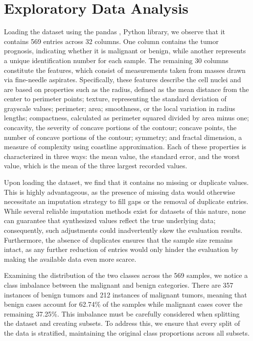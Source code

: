 \documentclass[en]{dimscthesis}
\begin{document}
\section{Exploratory Data Analysis} \label{eda}

Loading the dataset using the pandas \cite{bib:pandas}, \cite{bib:pandas_software} Python library, we observe that it contains 569 entries across 32 columns. One column contains the tumor prognosis, indicating whether it is malignant or benign, while another represents a unique identification number for each sample. The remaining 30 columns constitute the features, which consist of measurements taken from masses drawn via fine-needle aspirates. Specifically, these features describe the cell nuclei and are based on properties such as the radius, defined as the mean distance from the center to perimeter points; texture, representing the standard deviation of grayscale values; perimeter; area; smoothness, or the local variation in radius lengths; compactness, calculated as perimeter squared divided by area minus one; concavity, the severity of concave portions of the contour; concave points, the number of concave portions of the contour; symmetry; and fractal dimension, a measure of complexity using coastline approximation. Each of these properties is characterized in three ways: the mean value, the standard error, and the worst value, which is the mean of the three largest recorded values.

Upon loading the dataset, we find that it contains no missing or duplicate values. This is highly advantageous, as the presence of missing data would otherwise necessitate an imputation strategy to fill gaps or the removal of duplicate entries. While several reliable imputation methods exist for datasets of this nature, none can guarantee that synthesized values reflect the true underlying data; consequently, such adjustments could inadvertently skew the evaluation results. Furthermore, the absence of duplicates ensures that the sample size remains intact, as any further reduction of entries would only hinder the evaluation by making the available data even more scarce.

Examining the distribution of the two classes across the 569 samples, we notice a class imbalance between the malignant and benign categories. There are 357 instances of benign tumors and 212 instances of malignant tumors, meaning that benign cases account for 62.74\% of the samples while malignant cases cover the remaining 37.25\%. This imbalance must be carefully considered when splitting the dataset and creating subsets. To address this, we ensure that every split of the data is stratified, maintaining the original class proportions across all subsets.
\end{document}
